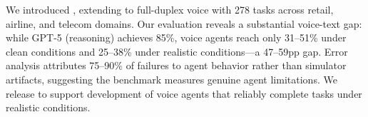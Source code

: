 We introduced \textbf{\tauvoice{}}, extending \tautwobench{} to full-duplex voice with 278 tasks across retail, airline, and telecom domains. Our evaluation reveals a substantial voice-text gap: while GPT-5 (reasoning) achieves 85\%, voice agents reach only 31--51\% under clean conditions and 25--38\% under realistic conditions---a 47--59pp gap. Error analysis attributes 75--90\% of failures to agent behavior rather than simulator artifacts, suggesting the benchmark measures genuine agent limitations. We release \tauvoice{} to support development of voice agents that reliably complete tasks under realistic conditions.
% 